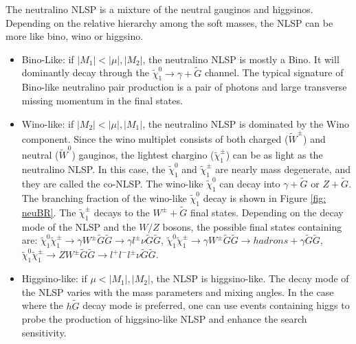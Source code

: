 \documentclass[thesis.tex]{subfiles}
\begin{document}
The neutralino NLSP is a mixture of the neutral gauginos and higgsinos. 
Depending on the relative hierarchy among the soft masses, the NLSP can be more like bino, wino or higgsino. 
\begin{itemize}
	\item Bino-Like: if $|M_1| < |\mu|,|M_2|$, the neutralino NLSP is mostly a Bino. It will dominantly decay through the $\tilde{\chi}_1^0 \rightarrow \gamma + \tilde{G}$ channel. 
	         The typical signature of Bino-like neutralino pair production is a pair of photons and large transverse missing momentum in the final states.  
	\item Wino-like: if $|M_2| < |\mu|, |M_1|$, the neutralino NLSP is dominated by the Wino component. 
		Since the wino multiplet consists of both charged ($\tilde{W}^\pm$) and neutral ($\tilde{W}^0$) gauginos, the lightest chargino ($\tilde{\chi}_1^\pm$) can be as light as the neutralino NLSP. 
		In this case, the $\tilde{\chi}_1^0$ and $\tilde{\chi}_1^\pm$ are nearly mass degenerate, and they are called the co-NLSP. 
		The wino-like $\tilde{\chi}_1^0$ can decay into $\gamma + \tilde{G}$ or $Z + \tilde{G}$. 
		The branching fraction of the wino-like $\tilde{\chi}_1^0$ decay is shown in Figure \ref{fig: neuBR}. 
		The $\tilde{\chi}_1^\pm$ decays to the $W^\pm+ \tilde{G}$ final states.  
		Depending on the decay mode of the NLSP and the $W/Z$ bosons, the possible final states containing are: $\tilde{\chi}_1^0\tilde{\chi}_1^\pm \rightarrow \gamma W^\pm \tilde{G}\tilde{G} \rightarrow  \gamma l^\pm \nu \tilde{G}\tilde{G} $, $\tilde{\chi}_1^0\tilde{\chi}_1^\pm \rightarrow \gamma W^\pm \tilde{G}\tilde{G} \rightarrow  hadrons + \gamma \tilde{G}\tilde{G} $, $\tilde{\chi}_1^0\tilde{\chi}_1^\pm \rightarrow Z W^\pm \tilde{G}\tilde{G} \rightarrow  l^+ l^- l^\pm \nu \tilde{G}\tilde{G} $.
	\item Higgsino-like: if $\mu < |M_1|, |M_2|$, the NLSP is higgsino-like. The decay mode of the NLSP varies with the mass parameters and mixing angles. In the case where the $h\tilde{G}$ decay mode is preferred, one can use events containing higgs to probe the production of higgsino-like NLSP and enhance the search sensitivity. 
\end{itemize}
\end{document}
